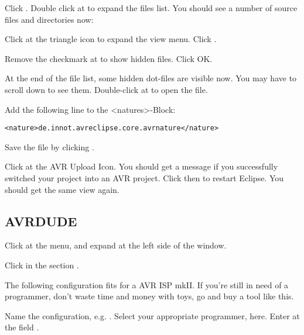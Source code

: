 Click . Double click at  to expand the files list. You should see a number of source files and directories now:


Click at the triangle icon to expand the view menu. Click . 


\clearpage
Remove the checkmark at  to show hidden files. Click OK.

At the end of the file list, some hidden dot-files are visible now. You may have to scroll down to
see them. Double-click at  to open the file.

Add the following line to the <natures>-Block:

\texttt{<nature>de.innot.avreclipse.core.avrnature</nature>}

Save the file by clicking .


Click at the AVR Upload Icon. You should get a message  if you successfully switched your project into an AVR project.
Click  then to restart Eclipse. You should get the same view again.

\subsection{AVRDUDE}

Click  at the menu, and expand  at the left
side of the  window.

Click  in the section .

The following configuration fits for a AVR ISP mkII. If you're still in need of a programmer,
don't waste time and money with toys, go and buy a tool like this. 

Name the configuration, e.g. . Select your appropriate programmer, 
 here. Enter  at the field .


